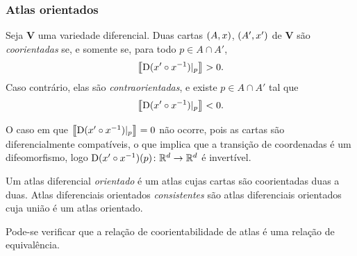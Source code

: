 \subsubsection{Atlas orientados}

\begin{definition}
Seja $\bm V$ uma variedade diferencial. Duas cartas $(A,x)$, $(A',x')$ de $\bm V$ são \emph{coorientadas} se, e somente se, para todo $p \in A \cap A'$,
	\begin{equation*}
	\left\llbracket{\mathrm{D}(x' \circ x^{-1})|_p}\right\rrbracket > 0.
	\end{equation*}
Caso contrário, elas são \emph{contraorientadas}, e existe $p \in A \cap A'$ tal que
	\begin{equation*}
	\left\llbracket{\mathrm{D}(x' \circ x^{-1})|_p}\right\rrbracket < 0.
	\end{equation*}
\end{definition}

O caso em que $\left\llbracket{\mathrm{D}(x' \circ x^{-1})|_p}\right\rrbracket = 0$ não ocorre, pois as cartas são diferencialmente compatíveis, o que implica que a transição de coordenadas é um difeomorfismo, logo $\mathrm{D}(x' \circ x^{-1})(p)\colon \mathbb{R}^d \to \mathbb{R}^d$ é invertível.

\begin{definition}
Um atlas diferencial \emph{orientado} é um atlas cujas cartas são coorientadas duas a duas. Atlas diferenciais orientados \emph{consistentes} são atlas diferenciais orientados cuja união é um atlas orientado.
\end{definition}

Pode-se verificar que a relação de coorientabilidade de atlas é uma relação de equivalência.









